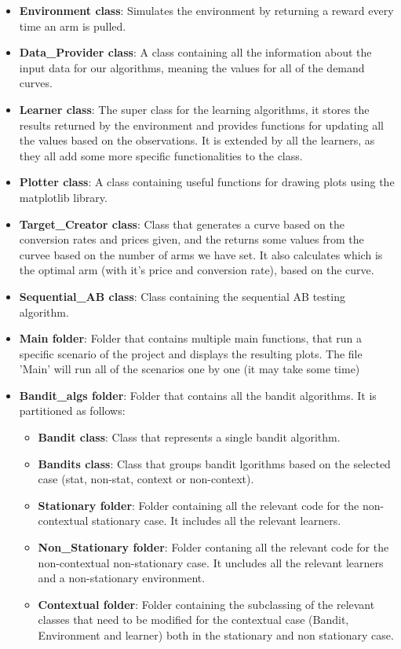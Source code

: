 \begin{itemize}
	\item \textbf{Environment class}: Simulates the environment by returning a reward every time an arm is pulled.
	\item \textbf{Data\_Provider class}: A class containing all the information about the input data for our algorithms, meaning the values for all of the demand curves.
	\item \textbf{Learner class}: The super class for the learning algorithms, it stores the results returned by the environment and provides functions for updating all the values based on the observations. It is extended by all the learners, as they all add some more specific functionalities to the class.
	\item \textbf{Plotter class}: A class containing useful functions for drawing plots using the matplotlib library.
	\item \textbf{Target\_Creator class}: Class that generates a curve based on the conversion rates and prices given, and the returns some values from the curvee based on the number of arms we have set. It also calculates which is the optimal arm (with it's price and conversion rate), based on the curve.
	\item \textbf{Sequential\_AB class}: Class containing the sequential AB testing algorithm.
	\item \textbf{Main folder}: Folder that contains multiple main functions, that run a specific scenario of the project and displays the resulting plots. The file 'Main' will run all of the scenarios one by one (it may take some time)
	\item \textbf{Bandit\_algs folder}: Folder that contains all the bandit algorithms. It is partitioned as follows:
	\begin{itemize}
		\item \textbf{Bandit class}: Class that represents a single bandit algorithm.
		\item \textbf{Bandits class}: Class that groups bandit lgorithms based on the selected case (stat, non-stat, context or non-context).
		\item \textbf{Stationary folder}: Folder containing all the relevant code for the non-contextual stationary case. It includes all the relevant learners.
		\item \textbf{Non\_Stationary folder}: Folder contaning all the relevant code for the non-contextual non-stationary case. It uncludes all the relevant learners and a non-stationary environment.
		\item \textbf{Contextual folder}: Folder containing the subclassing of the relevant classes that need to be modified for the contextual case (Bandit, Environment and learner) both in the stationary and non stationary case. 
	\end{itemize}
	
\end{itemize}

